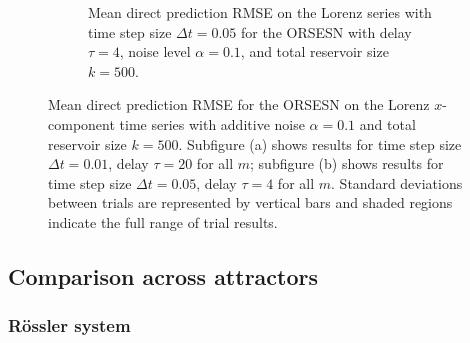 \begin{figure}
    \begin{subfigure}{\textwidth}
        \caption{Mean direct prediction RMSE on the Lorenz series with time step size $\Delta t=0.05$ for the ORSESN with delay $\tau=4$, noise level $\alpha=0.1$, and total reservoir size $k=500$.}
        \label{fig:ORSESN_direct_0_05}
        \centering
    \end{subfigure}

    \caption{Mean direct prediction RMSE for the ORSESN on the Lorenz $x$-component time series with additive noise $\alpha=0.1$ and total reservoir size $k=500$. Subfigure (a) shows results for time step size $\Delta t=0.01$, delay $\tau=20$ for all $m$; subfigure (b) shows results for time step size $\Delta t=0.05$, delay $\tau=4$ for all $m$. Standard deviations between trials are represented by vertical bars and shaded regions indicate the full range of trial results.}
    \label{fig:ORSESN_direct}
\end{figure}



\subsection{Comparison across attractors}

\subsubsection{R\"ossler system}

